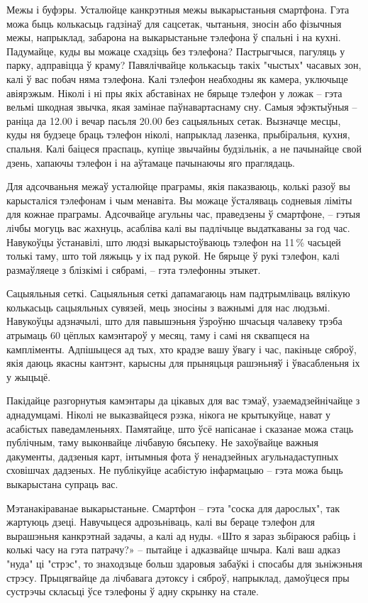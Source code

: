 Межы і буфэры. Усталюйце канкрэтныя межы выкарыстаньня смартфона. Гэта можа быць колькасьць гадзінаў для сацсетак, чытаньня, зносін або фізычныя межы, напрыклад, забарона на выкарыстаньне тэлефона ў спальні і на кухні. Падумайце, куды вы можаце схадзіць без тэлефона? Пастрыгчыся, пагуляць у парку, адправіцца ў краму? Павялічвайце колькасьць такіх "чыстых" часавых зон, калі ў вас побач няма тэлефона. Калі тэлефон неабходны як камера, уключыце авіярэжым. Ніколі і ні пры якіх абставінах не бярыце тэлефон у ложак – гэта вельмі шкодная звычка, якая замінае паўнавартаснаму сну. Самыя эфэктыўныя – раніца да 12.00 і вечар пасьля 20.00 без сацыяльных сетак. Вызначце месцы, куды ня будзеце браць тэлефон ніколі, напрыклад лазенка, прыбіральня, кухня, спальня. Калі баіцеся праспаць, купіце звычайны будзільнік, а не пачынайце свой дзень, хапаючы тэлефон і на аўтамаце пачынаючы яго праглядаць.

Для адсочваньня межаў усталюйце праграмы, якія паказваюць, колькі разоў вы карысталіся тэлефонам і чым менавіта. Вы можаце ўсталяваць содневыя ліміты для кожнае праграмы. Адсочвайце агульны час, праведзены ў смартфоне, – гэтыя лічбы могуць вас жахнуць, асабліва калі вы падлічыце выдаткаваны за год час. Навукоўцы ўстанавілі, што людзі выкарыстоўваюць тэлефон на 11\,\% часьцей толькі таму, што той ляжыць у іх пад рукой. Не бярыце ў рукі тэлефон, калі размаўляеце з блізкімі і сябрамі, – гэта тэлефонны этыкет.

Сацыяльныя сеткі. Сацыяльныя сеткі дапамагаюць нам падтрымліваць вялікую колькасьць сацыяльных сувязей, мець зносіны з важнымі для нас людзьмі. Навукоўцы адзначылі, што для павышэньня ўзроўню шчасьця чалавеку трэба атрымаць 60 цёплых камэнтароў у месяц, таму і самі ня сквапцеся на кампліменты. Адпішыцеся ад тых, хто крадзе вашу ўвагу і час, пакіньце сяброў, якія даюць якасны кантэнт, карысны для прыняцьця рашэньняў і ўвасабленьня іх у жыцьцё.

Пакідайце разгорнутыя камэнтары да цікавых для вас тэмаў, узаемадзейнічайце з аднадумцамі. Ніколі не выказвайцеся рэзка, нікога не крытыкуйце, нават у асабістых паведамленьнях. Памятайце, што ўсё напісанае і сказанае можа стаць публічным, таму выконвайце лічбавую бясьпеку. Не захоўвайце важныя дакументы, дадзеныя карт, інтымныя фота ў ненадзейных агульнадаступных сховішчах дадзеных. Не публікуйце асабістую інфармацыю – гэта можа быць выкарыстана супраць вас.

Мэтанакіраванае выкарыстаньне. Смартфон – гэта "соска для дарослых", так жартуюць дзеці. Навучыцеся адрозьніваць, калі вы бераце тэлефон для вырашэньня канкрэтнай задачы, а калі ад нуды. «Што я зараз зьбіраюся рабіць і колькі часу на гэта патрачу?» – пытайце і адказвайце шчыра. Калі ваш адказ "нуда" ці "стрэс", то знаходзьце больш здаровыя забаўкі і спосабы для зьніжэньня стрэсу. Прыцягвайце да лічбавага дэтоксу і сяброў, напрыклад, дамоўцеся пры сустрэчы скласьці ўсе тэлефоны ў адну скрынку на стале.


